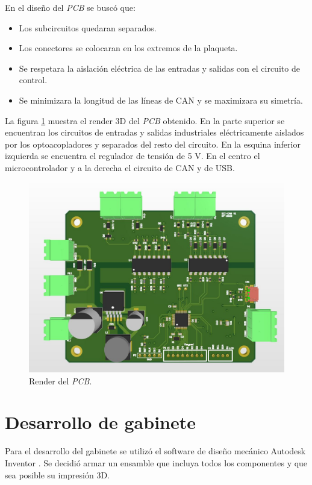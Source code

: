 En el diseño del \textit{PCB} se buscó que:
\begin{itemize}
	\item Los subcircuitos quedaran separados.
	\item Los conectores se colocaran en los extremos de la plaqueta.
	\item Se respetara la aislación eléctrica de las entradas y salidas con el circuito de control.
	\item Se minimizara la longitud de las líneas de CAN y se maximizara su simetría.
\end{itemize}

La figura \ref{fig:render_pcb} muestra el render 3D del \textit{PCB} obtenido. En la parte superior se encuentran los circuitos de entradas y salidas industriales eléctricamente aislados por los optoacopladores y separados del resto del circuito. En la esquina inferior izquierda se encuentra el regulador de tensión de 5 V. En el centro el microcontrolador y a la derecha el circuito de CAN y de USB.

\begin{figure}[htbp]
	\centering
	\includegraphics[scale=.4]{./Figures/pcb_sch.JPG}
	\caption{Render del \textit{PCB}.}
	\label{fig:render_pcb}
\end{figure}

\section{Desarrollo de gabinete}

Para el desarrollo del gabinete se utilizó el software de diseño mecánico Autodesk Inventor \citep{web_inventor}. Se decidió armar un ensamble que incluya todos los componentes y que sea posible su impresión 3D.

